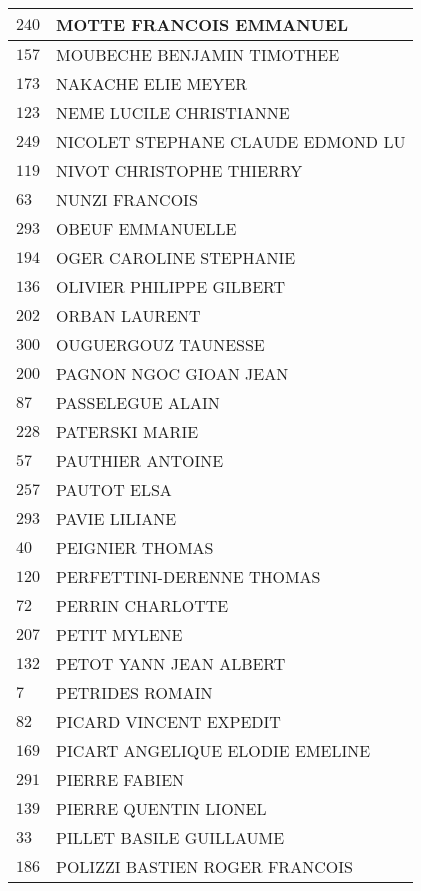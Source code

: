 \begin{xltabular}{\linewidth}{|l|X|}
    \hline
    $240$ & MOTTE FRANCOIS EMMANUEL \\
    \hline
    $157$ & MOUBECHE BENJAMIN TIMOTHEE \\
    \hline
    $173$ & NAKACHE ELIE MEYER \\
    \hline
    $123$ & NEME LUCILE CHRISTIANNE \\
    \hline
    $249$ & NICOLET STEPHANE CLAUDE EDMOND LU \\
    \hline
    $119$ & NIVOT CHRISTOPHE THIERRY \\
    \hline
    $63$ & NUNZI FRANCOIS \\
    \hline
    $293$ & OBEUF EMMANUELLE \\
    \hline
    $194$ & OGER CAROLINE STEPHANIE \\
    \hline
    $136$ & OLIVIER PHILIPPE GILBERT \\
    \hline
    $202$ & ORBAN LAURENT \\
    \hline
    $300$ & OUGUERGOUZ TAUNESSE \\
    \hline
    $200$ & PAGNON NGOC GIOAN JEAN \\
    \hline
    $87$ & PASSELEGUE ALAIN \\
    \hline
    $228$ & PATERSKI MARIE \\
    \hline
    $57$ & PAUTHIER ANTOINE \\
    \hline
    $257$ & PAUTOT ELSA \\
    \hline
    $293$ & PAVIE LILIANE \\
    \hline
    $40$ & PEIGNIER THOMAS \\
    \hline
    $120$ & PERFETTINI-DERENNE THOMAS \\
    \hline
    $72$ & PERRIN CHARLOTTE \\
    \hline
    $207$ & PETIT MYLENE \\
    \hline
    $132$ & PETOT YANN JEAN ALBERT \\
    \hline
    $7$ & PETRIDES ROMAIN \\
    \hline
    $82$ & PICARD VINCENT EXPEDIT \\
    \hline
    $169$ & PICART ANGELIQUE ELODIE EMELINE \\
    \hline
    $291$ & PIERRE FABIEN \\
    \hline
    $139$ & PIERRE QUENTIN LIONEL \\
    \hline
    $33$ & PILLET BASILE GUILLAUME \\
    \hline
    $186$ & POLIZZI BASTIEN ROGER FRANCOIS \\
    \hline

\end{xltabular}
